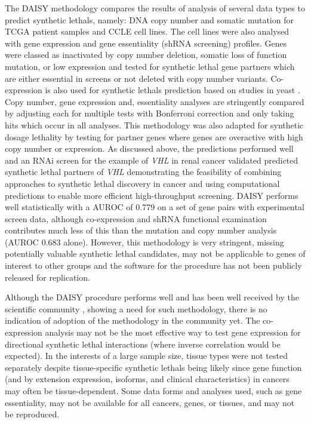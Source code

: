 The \gls{DAISY} methodology \citep{Jerby2014} compares the results of analysis of several data types to predict \glspl{synthetic lethal}, namely: DNA copy number and somatic mutation for \gls{TCGA} patient samples and \gls{CCLE} cell lines. The cell lines were also analysed with gene expression and gene essentiality (shRNA screening) profiles. Genes were classed as inactivated by copy number deletion, somatic loss of function mutation, or low expression and tested for \gls{synthetic lethal} gene partners which are either essential in screens or not deleted with copy number variants. Co-expression is also used for \glspl{synthetic lethal} prediction based on studies in yeast \citep{Costanzo2010, Kelley2005}. Copy number, gene expression and, essentiality analyses are stringently compared by adjusting each for multiple tests with Bonferroni correction and only taking hits which occur in all analyses. This methodology was also adapted for synthetic dosage lethality by testing for partner genes where genes are overactive with high copy number or expression. As discussed above, the predictions performed well and an \gls{RNAi} screen for the example of \textit{VHL} in renal cancer validated predicted \gls{synthetic lethal} partners of \textit{VHL} demonstrating the feasibility of combining approaches to \gls{synthetic lethal} discovery in cancer and using computational predictions to enable more efficient high-throughput screening. \gls{DAISY} performs well statistically with a \gls{AUROC} of 0.779 on a set of gene pairs with experimental screen data, although co-expression and shRNA functional examination contributes much less of this than the mutation and copy number analysis (\gls{AUROC} 0.683 alone). However, this methodology is very stringent, missing potentially valuable \gls{synthetic lethal} candidates, may not be applicable to genes of interest to other groups and the software for the procedure has not been publicly released for replication.  

Although the \gls{DAISY} procedure performs well and has been well received by the scientific community \citep{Crunkhorn2014, Lokody2014, Ryan2014}, showing a need for such methodology, there is no indication of adoption of the methodology in the community yet. The co-expression analysis may not be the most effective way to test gene expression for directional \gls{synthetic lethal} interactions (where inverse correlation would be expected). In the interests of a large sample size, tissue types were not tested separately despite tissue-specific \glspl{synthetic lethal} being likely since gene function (and by extension expression, isoforms, and clinical characteristics) in cancers may often be tissue-dependent. Some data forms and analyses used, such as gene essentiality, may not be available for all cancers, genes, or tissues, and may not be reproduced.  

